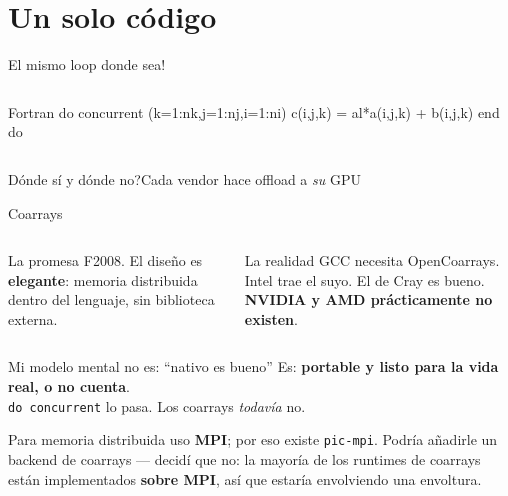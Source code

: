\documentclass[aspectratio=169]{beamer}
\begin{document}
\section{Un solo código}

\begin{frame}[fragile]{El mismo loop donde sea!}
  \begin{columns}[T,onlytextwidth]
      \begin{cookiecode}[title=Fortran estándar]{Fortran}
do concurrent (k=1:nk,j=1:nj,i=1:ni)
  c(i,j,k) = al*a(i,j,k) + b(i,j,k)
end do
      \end{cookiecode}
  \end{columns}
  \vspace{.3em}
  
\end{frame}

\begin{frame}{Dónde sí y dónde no?}{Cada vendor hace offload a \emph{su} GPU }
  \centering
  \scalebox{0.86}{}
\end{frame}

\begin{frame}{Coarrays}
  \begin{columns}[T,onlytextwidth]
      \begin{block}{La promesa}
        {\footnotesize F2008. El diseño es \textbf{elegante}: memoria distribuida
        dentro del lenguaje, sin biblioteca externa.}
      \end{block}
      \begin{alertblock}{La realidad}
        {\footnotesize GCC necesita OpenCoarrays. Intel trae el suyo. El de Cray es bueno.
        \textbf{NVIDIA y AMD prácticamente no existen}.}
      \end{alertblock}
  \end{columns}
  \vspace{.5em}
  \begin{exampleblock}{Mi modelo mental no es: ``nativo es bueno''}
    \centering Es: \textbf{portable y listo para la vida real, o no cuenta}. \\
    {\footnotesize \texttt{do concurrent} lo pasa. Los coarrays \emph{todavía} no.}
  \end{exampleblock}
  \vspace{.3em}
  {\footnotesize Para memoria distribuida uso \textbf{MPI}; por eso existe \texttt{pic-mpi}.
  Podría añadirle un backend de coarrays --- decidí que no: la mayoría de los runtimes de
  coarrays están implementados \textbf{sobre MPI}, así que estaría envolviendo una envoltura.}
\end{frame}
\end{document}

